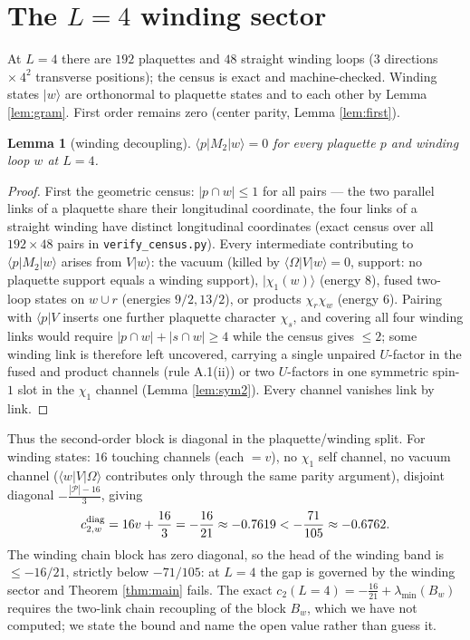 \documentclass[11pt]{article}
\newtheorem{lemma}[theorem]{Lemma}
\begin{document}
\section{The $L=4$ winding sector}\label{sec:L4}
At $L=4$ there are $192$ plaquettes and $48$ straight winding loops
($3$ directions $\times\ 4^2$ transverse positions); the census is exact and
machine-checked. Winding states $|w\rangle$ are orthonormal to plaquette
states and to each other by Lemma \ref{lem:gram}. First order remains zero
(center parity, Lemma \ref{lem:first}). \begin{lemma}[winding decoupling]\label{lem:mix}
$\langle p|M_2|w\rangle=0$ for every plaquette $p$ and winding loop $w$ at
$L=4$.
\end{lemma}
\begin{proof}
First the geometric census: $|p\cap w|\le1$ for all pairs --- the two
parallel links of a plaquette share their longitudinal coordinate, the four
links of a straight winding have distinct longitudinal coordinates (exact
census over all $192\times48$ pairs in \texttt{verify\_census.py}). Every
intermediate contributing to $\langle p|M_2|w\rangle$ arises from $V|w\rangle$:
the vacuum (killed by $\langle\Omega|V|w\rangle=0$, support: no plaquette
support equals a winding support), $|\chi_1(w)\rangle$ (energy $8$), fused
two-loop states on $w\cup r$ (energies $9/2,13/2$), or products $\chi_r\chi_w$
(energy $6$). Pairing with $\langle p|V$ inserts one further plaquette
character $\chi_s$, and covering all four winding links would require
$|p\cap w|+|s\cap w|\ge4$ while the census gives $\le2$; some winding link is
therefore left uncovered, carrying a single unpaired $U$-factor in the fused
and product channels (rule A.1(ii)) or two $U$-factors in one symmetric
spin-$1$ slot in the $\chi_1$ channel (Lemma \ref{lem:sym2}). Every channel
vanishes link by link.
\end{proof}
Thus the second-order block is diagonal in the plaquette/winding split. For winding states: $16$ touching channels (each
$=v$), no $\chi_1$ self channel, no vacuum channel
($\langle w|V|\Omega\rangle$ contributes only through the same parity
argument), disjoint diagonal $-\frac{|\mathcal P|-16}{3}$, giving
\[
c_{2,w}^{\rm diag}=16v+\frac{16}{3}=-\frac{16}{21}\approx-0.7619
<-\frac{71}{105}\approx-0.6762 .
\]
The winding chain block has zero diagonal, so the head of the winding band is
$\le-16/21$, strictly below $-71/105$: at $L=4$ the gap is governed by the
winding sector and Theorem \ref{thm:main} fails. The exact
$c_2(L{=}4)=-\frac{16}{21}+\lambda_{\min}(B_w)$ requires the two-link chain
recoupling of the block $B_w$, which we have not computed; we state the
bound and name the open value rather than guess it.
\end{document}
